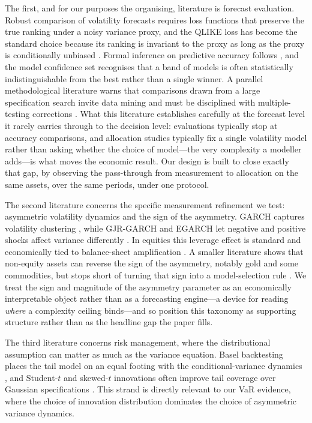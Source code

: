 The first, and for our purposes the organising, literature is forecast evaluation. Robust comparison of volatility forecasts requires loss functions that preserve the true ranking under a noisy variance proxy, and the QLIKE loss has become the standard choice because its ranking is invariant to the proxy as long as the proxy is conditionally unbiased \citep{patton2011}. Formal inference on predictive accuracy follows \citet{diebold1995}, and the model confidence set \citep{hansen2011} recognises that a band of models is often statistically indistinguishable from the best rather than a single winner. A parallel methodological literature warns that comparisons drawn from a large specification search invite data mining and must be disciplined with multiple-testing corrections \citep{harvey2016}. What this literature establishes carefully at the forecast level it rarely carries through to the decision level: evaluations typically stop at accuracy comparisons, and allocation studies typically fix a single volatility model rather than asking whether the choice of model---the very complexity a modeller adds---is what moves the economic result. Our design is built to close exactly that gap, by observing the pass-through from measurement to allocation on the same assets, over the same periods, under one protocol.

The second literature concerns the specific measurement refinement we test: asymmetric volatility dynamics and the sign of the asymmetry. GARCH captures volatility clustering \citep{bollerslev1986}, while GJR-GARCH and EGARCH let negative and positive shocks affect variance differently \citep{glosten1993,nelson1991}. In equities this leverage effect is standard and economically tied to balance-sheet amplification \citep{black1976,christie1982,engle2018}. A smaller literature shows that non-equity assets can reverse the sign of the asymmetry, notably gold and some commodities, but stops short of turning that sign into a model-selection rule \citep{chevallier2017,batten2010,chang2021}. We treat the sign and magnitude of the asymmetry parameter as an economically interpretable object rather than as a forecasting engine---a device for reading \emph{where} a complexity ceiling binds---and so position this taxonomy as supporting structure rather than as the headline gap the paper fills.

The third literature concerns risk management, where the distributional assumption can matter as much as the variance equation. Basel backtesting places the tail model on an equal footing with the conditional-variance dynamics \citep{bcbs2006,bcbs2019,kupiec1995,christoffersen1998}, and Student-$t$ and skewed-$t$ innovations often improve tail coverage over Gaussian specifications \citep{bollerslev1987,hansen1994,kuester2006}. This strand is directly relevant to our VaR evidence, where the choice of innovation distribution dominates the choice of asymmetric variance dynamics.

